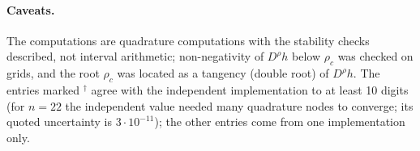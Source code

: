 \paragraph{Caveats.} The computations are quadrature computations with the stability checks described, not interval arithmetic; non-negativity of $D^\rho h$ below $\rho_c$ was checked on grids, and the root $\rho_c$ was located as a tangency (double root) of $D^\rho h$. The entries marked $^\dagger$ agree with the independent implementation to at least 10 digits (for $n=22$ the independent value needed many quadrature nodes to converge; its quoted uncertainty is $3\cdot10^{-11}$); the other entries come from one implementation only.
